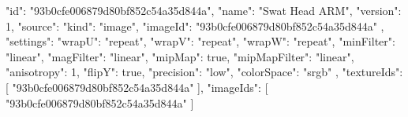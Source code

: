 {
  "id": "93b0cfe006879d80bf852c54a35d844a",
  "name": "Swat Head ARM",
  "version": 1,
  "source": {
    "kind": "image",
    "imageId": "93b0cfe006879d80bf852c54a35d844a"
  },
  "settings": {
    "wrapU": "repeat",
    "wrapV": "repeat",
    "wrapW": "repeat",
    "minFilter": "linear",
    "magFilter": "linear",
    "mipMap": true,
    "mipMapFilter": "linear",
    "anisotropy": 1,
    "flipY": true,
    "precision": "low",
    "colorSpace": "srgb"
  },
  "textureIds": [
    "93b0cfe006879d80bf852c54a35d844a"
  ],
  "imageIds": [
    "93b0cfe006879d80bf852c54a35d844a"
  ]
}
